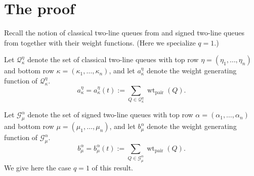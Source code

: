 \documentclass[12pt]{amsart}
\theoremstyle{definition}
\newcommand{\bfx}{\boldsymbol{x}}
\DeclareMathOperator{\wt}{wt}
\DeclareMathOperator{\pair}{pair}
\newcommand{\mcG}{\mathcal{G}}
\begin{document}
\newpage 

\section{The proof} 

Recall the notion of classical two-line queues 
from \cite{CorteelMandelshtamWilliams2022} and signed two-line queues from \cite{BenDaliWilliams2025} together with their weight functions.  (Here we specialize  $q=1$.)



Let  $\mathcal{Q}_\kappa^\eta$ denote the set of 
classical two-line queues with top row $\eta=(\eta_1,\dots,\eta_n)$ and bottom row $\kappa=(\kappa_1,\dots,\kappa_n)$, and  let
$a^\eta_{\kappa}$  
denote  the weight generating function of $\mathcal{Q}_{\kappa}^{\eta}$.
\begin{equation}\label{eq:generating_function0}
    a_\kappa^\eta=a_\kappa^\eta(t):=\sum_{Q\in\mathcal{Q}_\kappa^\eta}\wt_{\pair}(Q).
\end{equation}

Let $\mcG^\alpha_\mu$ denote the
set of signed two-line queues with 
top row $\alpha=(\alpha_1,\dots,\alpha_n)$ and 
bottom row $\mu=(\mu_1,\dots,\mu_n)$, and let
$b_\mu^\alpha$  denote the weight generating function of $\mcG^\alpha_\mu$. 
\begin{equation}\label{eq:generating_function1}
    b_\mu^\alpha=b_\mu^\alpha(t):=\sum_{Q\in\mcG_\mu^\alpha}\wt_{\pair}(Q).
\end{equation}
\iffalse 
We give here the case $q=1$ of this result.
\end{document}
